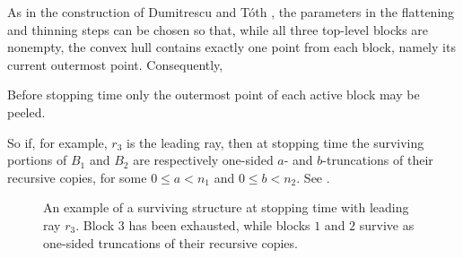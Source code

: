 \documentclass[11pt]{amsart}
\theoremstyle{definition}
\begin{document}
As in the construction of Dumitrescu and T\'oth
\cite{dumitrescuToth2025peeling}, 
the parameters in the 
flattening and thinning steps can 
be chosen so that, 
while all three top-level
blocks are nonempty, the convex hull contains exactly one point
from each block, namely its current outermost point. Consequently, 
\begin{properties}
     \item\label{property1} Before stopping time only the outermost point 
    of each active block may be peeled.
\end{properties}
   

    So if, for example,
    $r_3$ is the leading ray, then at stopping time the surviving portions of $B_1$ and $B_2$ are  respectively one-sided $a$- and $b$-truncations of their recursive copies, for some $0\leq a < n_1$ and $0 \le b < n_2$. See .

\begin{figure}[h]
\centering
{}

\caption{
An example of a surviving structure at stopping time with leading ray $r_3$. Block $3$ has been exhausted, while blocks
$1$ and $2$ survive as one-sided truncations of their recursive copies.} 
\label{fig:surviving-structure}
\end{figure}
\end{document}
